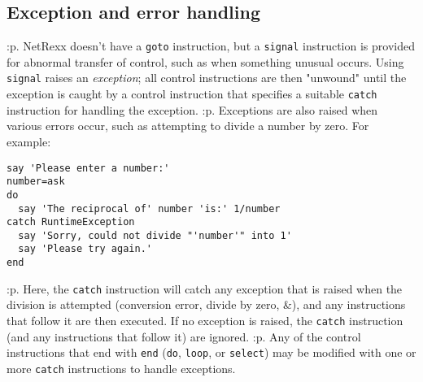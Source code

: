 \subsection{Exception and error handling}\label{refoexcep}
:p.
NetRexx doesn't have a \texttt{goto} instruction, but a \texttt{signal}
instruction is provided for abnormal transfer of control, such as when
something unusual occurs.  Using \texttt{signal} raises an
\emph{exception}; all control instructions are then "unwound"
until the exception is caught by a control instruction that specifies a
suitable \texttt{catch} instruction for handling the exception.
:p.
Exceptions are also raised when various errors occur, such as attempting
to divide a number by zero.  For example:
\begin{verbatim}
say 'Please enter a number:'
number=ask
do
  say 'The reciprocal of' number 'is:' 1/number
catch RuntimeException
  say 'Sorry, could not divide "'number'" into 1'
  say 'Please try again.'
end
\end{verbatim}
:p.
Here, the \texttt{catch} instruction will catch any exception that is
raised when the division is attempted (conversion error, divide by zero,
\&), and any instructions that follow it are then executed.  If no
exception is raised, the \texttt{catch} instruction (and any
instructions that follow it) are ignored.
:p.
Any of the control instructions that end with \texttt{end} (\texttt{do},
\texttt{loop}, or \texttt{select}) may be modified with one or more
\texttt{catch} instructions to handle exceptions.
